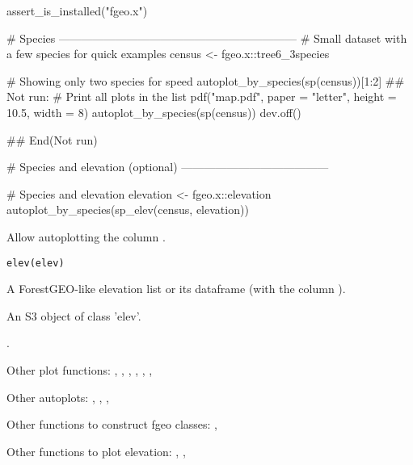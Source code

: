 \documentclass[a4paper]{book}
\begin{document}
%
\begin{Examples}
\begin{ExampleCode}
assert_is_installed("fgeo.x")

# Species ---------------------------------------------------------------
# Small dataset with a few species for quick examples
census <- fgeo.x::tree6_3species

# Showing only two species for speed
autoplot_by_species(sp(census))[1:2]
## Not run: 
# Print all plots in the list
pdf("map.pdf", paper = "letter", height = 10.5, width = 8)
autoplot_by_species(sp(census))
dev.off()

## End(Not run)

# Species and elevation (optional) ---------------------------------------

# Species and elevation
elevation <- fgeo.x::elevation
autoplot_by_species(sp_elev(census, elevation))
\end{ExampleCode}
\end{Examples}
%
\begin{Description}\relax
Allow autoplotting the column .
\end{Description}
%
\begin{Usage}
\begin{verbatim}
elev(elev)
\end{verbatim}
\end{Usage}
%
\begin{Arguments}
\begin{ldescription}
\item[\code{elev}] A ForestGEO-like elevation list or its  dataframe (with
the column ).
\end{ldescription}
\end{Arguments}
%
\begin{Value}
An S3 object of class 'elev'.
\end{Value}
%
\begin{SeeAlso}\relax
{}.

Other plot functions: ,
,
,
,
,
, 

Other autoplots: ,
, ,

Other functions to construct fgeo classes: ,

Other functions to plot elevation: ,
,
\end{SeeAlso}
\end{document}

